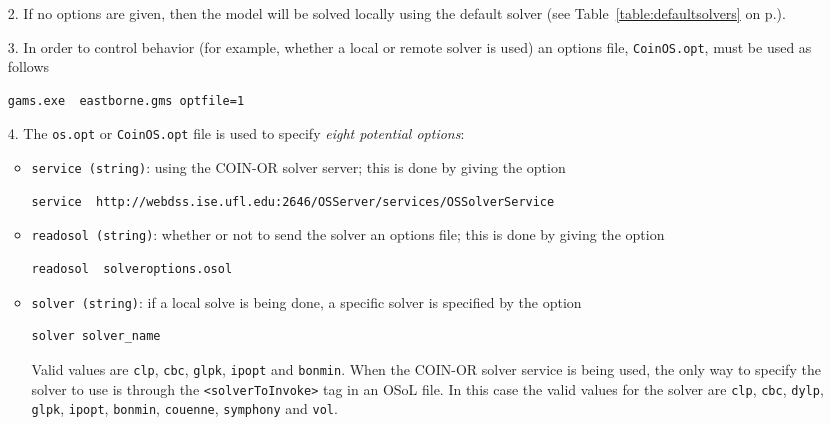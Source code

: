 \documentclass[11pt]{article}
\renewcommand{\_}{{\char"5F}}
\renewcommand{\{}{{\char"7B}}
\renewcommand{\}}{{\char"7D}}
\renewcommand{\^}{{\char"0D}}
\renewcommand{\'}{{\char"0D}}
\begin{document}
\begin{enumerate}[Step 1:]
\begin{enumerate}
\item[2.]   If no options are given, then the model will be solved locally using the default solver 
(see Table~\ref{table:defaultsolvers} on p.\pageref{table:defaultsolvers}).

\item[3.] In order to control behavior (for example, whether a local or remote solver is used)  an options
 file,  {\tt CoinOS.opt}, must be used as follows

\begin{verbatim}
gams.exe  eastborne.gms optfile=1
\end{verbatim}

\item[4.]  The {\tt os.opt} or {\tt CoinOS.opt} file is used to specify {\it eight potential options}:


\begin{itemize}
\item {\tt service (string)}: using the COIN-OR solver server; this is done by giving the option

\begin{verbatim}
service  http://webdss.ise.ufl.edu:2646/OSServer/services/OSSolverService
\end{verbatim}


\item  {\tt readosol (string)}: whether or not to send the solver an options file; this is done by 
giving the option
\begin{verbatim}
readosol  solveroptions.osol
\end{verbatim}


\item   {\tt solver (string)}: if a local solve is being done,  a specific solver is specified by 
the option
\begin{verbatim}
solver solver_name
\end{verbatim}

Valid values are {\tt clp},  {\tt cbc}, {\tt glpk}, {\tt ipopt} and {\tt bonmin}. %
When the COIN-OR solver service is being used, the only way to specify the solver to use is through 
the {\tt <solverToInvoke>} tag in an OSoL file. In this case the valid values for the solver are  
{\tt clp}, {\tt cbc}, {\tt dylp}, {\tt glpk}, {\tt ipopt}, {\tt bonmin}, {\tt couenne}, {\tt symphony}
and {\tt vol}.




\end{itemize}
\end{enumerate}
\end{enumerate}
\end{document}
